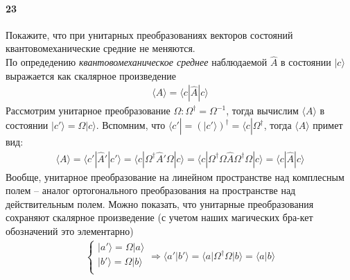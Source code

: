



\paragraph{23}
Покажите, что при унитарных преобразованиях векторов состояний квантовомеханические средние не меняются.\\

По опредедению \textit{квантовомеханическое среднее} наблюдаемой $\hat{A}$ в состоянии $|c\rangle$ выражается как скалярное произведение
\begin{gather*}
\langle A \rangle = \langle c|\hat{A}|c\rangle
\end{gather*}
Рассмотрим унитарное преобразование $\Omega\colon \Omega^\dagger=\Omega^{-1}$, тогда вычислим $\langle A\rangle$ в состоянии $|c'\rangle=\Omega|c\rangle$. Вспомним, что $\langle c'|=\left(|c'\rangle\right)^\dagger=\langle c|\Omega^\dagger$, тогда $\langle A\rangle$ примет вид:
\begin{gather*}
\langle A \rangle
=
\langle c'|\hat{A}'|c'\rangle
=
\langle c|\Omega^\dagger \hat{A}' \Omega|c\rangle
=
\langle c|\Omega^\dagger \Omega\hat{A}\Omega^\dagger \Omega|c\rangle
=
\langle c|\hat{A}|c\rangle
\end{gather*}
Вообще, унитарное преобразование на линейном пространстве над комплесным полем -- аналог ортогонального преобразования на пространстве над действительным полем. Можно показать, что унитарные преобразования сохраняют скалярное произведение (с учетом наших магических бра-кет обозначений это элементарно)
\begin{gather*}
\begin{cases}
|a'\rangle = \Omega|a\rangle\\
|b'\rangle = \Omega|b\rangle\\
\end{cases}
\Longrightarrow
\langle a'|b'\rangle
=
\langle a|\Omega^\dagger \Omega |b\rangle
=
\langle a|b\rangle
\end{gather*}

